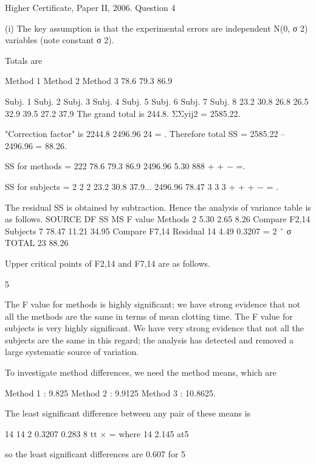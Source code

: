\documentclass[a4paper,12pt]{article}
\begin{document}
Higher Certificate, Paper II, 2006.  Question 4 
 
 
(i) The key assumption is that the experimental errors are independent N(0, σ 2) variables (note constant σ 2). 
 
Totals are 
 
Method 1 Method 2 Method 3 78.6 79.3 86.9 
 
Subj. 1 Subj. 2 Subj. 3 Subj. 4 Subj. 5 Subj. 6 Subj. 7 Subj. 8 23.2 30.8 26.8 26.5 32.9 39.5 27.2 37.9 
 The grand total is 244.8.     ΣΣyij2 = 2585.22. 
 
"Correction factor" is 
2244.8 2496.96 24 = . 
 Therefore total SS = 2585.22 – 2496.96 = 88.26. 
 
SS for methods = 
222 78.6 79.3 86.9 2496.96 5.30 888 + + − =. 
 
SS for subjects = 
2 2 2 23.2 30.8 37.9... 2496.96 78.47 3 3 3 + + + − = . 
 
 
The residual SS is obtained by subtraction. 
 Hence the analysis of variance table is as follows. 
 SOURCE DF SS MS F value Methods   2   5.30   2.65        8.26   Compare F2,14 Subjects   7 78.47 11.21      34.95   Compare F7,14 Residual 14   4.49 0.3207 = 2 ˆ σ
 TOTAL 23 88.26   
 
 
Upper critical points of F2,14 and F7,14 are as follows. 
 
 5%
 
 
 
 
 

The F value for methods is highly significant;  we have strong evidence that not all the methods are the same in terms of mean clotting time.  The F value for subjects is very highly significant.  We have very strong evidence that not all the subjects are the same in this regard;  the analysis has detected and removed a large systematic source of variation. 
 
 
 
To investigate method differences, we need the method means, which are 
 
Method 1 :   9.825         Method 2 :   9.9125         Method 3 :   10.8625. 
 
The least significant difference between any pair of these means is 
 
14 14 2 0.3207 0.283 8 tt × =     where   14 2.145 at5%
 
so the least significant differences are 0.607 for 5%
 
\end{document}
